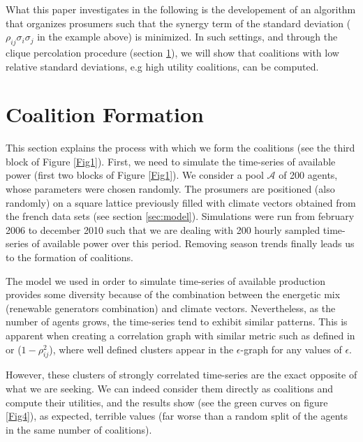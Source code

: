 \documentclass[conference]{IEEEtran}
\begin{document}
What this paper investigates in the following is the developement of an algorithm that organizes prosumers such that the synergy term of the standard deviation ($ \rho_{ij}\sigma_{i}\sigma_{j} $ in the example above) is minimized. In such settings, and through the clique percolation procedure (section \ref{sec:forming}), we will show that coalitions with low relative standard deviations, e.g high utility coalitions, can be computed.

%
%

\section{Coalition Formation}
\label{sec:forming}

This section explains the process with which we form the coalitions (see the third block of Figure \ref{Fig1}). First, we need to simulate the time-series of available power (first two blocks of Figure \ref{Fig1}). We consider a pool $ \mathcal{A} $ of 200 agents, whose parameters were chosen randomly. The prosumers are positioned (also randomly) on a square lattice previously filled with climate vectors obtained from the french data sets (see section \ref{sec:model}). Simulations were run from february 2006 to december 2010 such that we are dealing with 200 hourly sampled time-series of available power over this period. Removing season trends finally leads us to the formation of coalitions. 

The model we used in order to simulate time-series of available production provides some diversity because of the combination between the energetic mix (renewable generators combination) and climate vectors. Nevertheless, as the number of agents grows, the time-series tend to exhibit similar patterns. This is apparent when creating a correlation graph with similar metric such as defined in \cite{Garas2008} or \cite{Onnela2004} ($ 1 - \rho_{ij}^{2} $), where well defined clusters appear in the $ \epsilon $-graph for any values of $ \epsilon $. 

However, these clusters of strongly correlated time-series are the exact opposite of what we are seeking. We can indeed consider them directly as coalitions and compute their utilities, and the results show (see the green curves on figure \ref{Fig4}), as expected, terrible values (far worse than a random split of the agents in the same number of coalitions).
\end{document}
